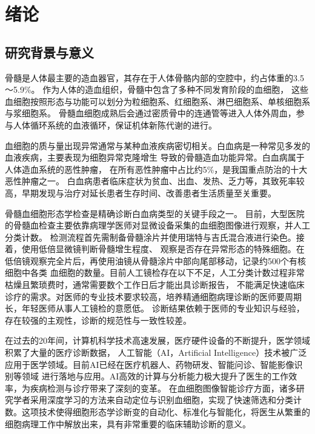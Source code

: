 
\chapter{绪论}
\section{研究背景与意义}
骨髓是人体最主要的造血器官，其存在于人体骨骼内部的空腔中，约占体重的3.5～5.9\%。
作为人体的造血组织，骨髓中包含了多种不同发育阶段的血细胞，
这些血细胞按照形态与功能可以划分为粒细胞系、红细胞系、淋巴细胞系、单核细胞系与浆细胞系。
骨髓血细胞成熟后会通过密质骨中的连通管等进入人体外周血，参与人体循环系统的血液循环，保证机体新陈代谢的进行。

血细胞的质与量出现异常通常与某种血液疾病密切相关。白血病\cite{黄治虎2009我国白血病流行病学调查的现状和对策}是一种常见多发的血液疾病，主要表现为细胞异常克隆增生
导致的骨髓造血功能异常。白血病属于人体造血系统的恶性肿瘤，
在所有恶性肿瘤中占比约5\%，是我国重点防治的十大恶性肿瘤之一。
白血病患者临床症状为贫血、出血、发热、乏力等，其致死率较高，早期发现与治疗对延长患者生存时间、改善患者生活质量至关重要。

骨髓血细胞形态学检查是精确诊断白血病类型的关键手段之一\cite{heimpel1979conventional}。
目前，大型医院的骨髓血检查主要依靠病理学医师对显微设备采集的血细胞图像进行观察，并人工分类计数。
检测流程首先需制备骨髓涂片并使用瑞特与吉氏混合液进行染色。接着，使用低倍显微镜判断骨髓增生程度、
观察是否存在异常形态的特殊细胞。在低倍镜观察完全片后，再使用油镜从骨髓涂片中部向尾部移动，记录约500个有核细胞中各类
血细胞的数量。目前人工镜检存在以下不足，人工分类计数过程非常枯燥且繁琐费时，通常需要数个工作日后才能出具诊断报告，
不能满足快速临床诊疗的需求。对医师的专业技术要求较高，培养精通细胞病理诊断的医师要周期长，年轻医师从事人工镜检的意愿低。
诊断结果依赖于医师的专业知识与经验，存在较强的主观性，诊断的规范性与一致性较差。

在过去的20年间，计算机科学技术高速发展，医疗硬件设备的不断提升，医学领域积累了大量的医疗诊断数据，
人工智能（AI，Artificial Intelligence）技术被广泛应用于医学领域\cite{2018Data}。目前AI已经在医疗机器人、药物研发、智能问诊、智能影像识别等领域
进行落地与应用。AI高效的计算与分析能力极大提升了医生的工作效率，为疾病检测与诊疗带来了深刻的变革。
在血细胞图像智能诊疗方面，诸多研究学者采用深度学习的方法来自动定位与识别血细胞，实现了快速筛选和分类计数。这项技术使得细胞形态学诊断变的自动化、标准化与智能化，将医生从繁重的细胞病理工作中解放出来，具有非常重要的临床辅助诊断的意义。

